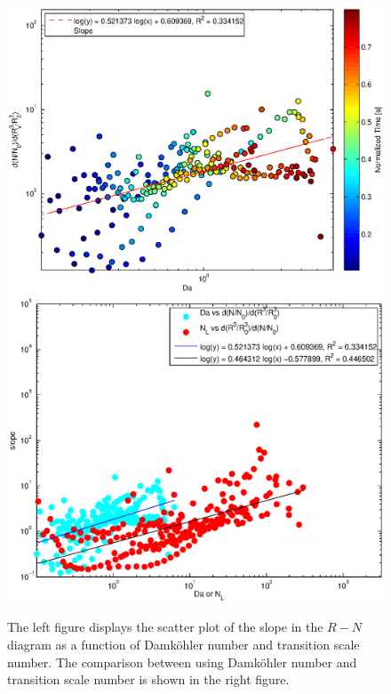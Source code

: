 \begin{figure}[!htbp]\centering
\includegraphics[width=0.49\linewidth]{Figures/slope_da}
\includegraphics[width=0.49\linewidth]{Figures/slope_da_nl}
\caption{The left figure displays the scatter plot of the slope in the $R-N$ diagram as a function 
of Damk\"{o}hler number and transition scale number. The comparison between using Damk\"{o}hler 
number and transition scale number is shown in the right figure.}
\label{fig:slope_da_nl}
\end{figure}

